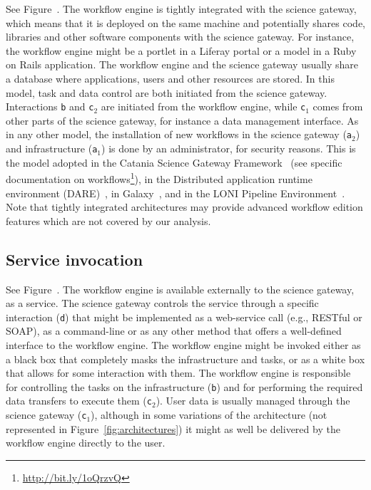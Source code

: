 \documentclass[preprint,3p,twocolumn]{elsarticle}
\begin{document}
See Figure~. The workflow engine is tightly
integrated with the science gateway, which means that it is deployed
on the same machine and potentially shares code, libraries and other
software components with the science gateway. For instance, the
workflow engine might be a portlet in a Liferay portal or a model
in a Ruby on Rails application. The workflow engine and the science
gateway usually share a database where applications, users and other
resources are stored.  In this model, task and
data control are both initiated from the science gateway. Interactions
\texttt{b} and \texttt{c$_2$} are initiated from the workflow engine,
while \texttt{c$_1$} comes from other parts of the science gateway,
for instance a data management interface. As in any other model, the
installation of new workflows in the science gateway (\texttt{a$_2$})
and infrastructure (\texttt{a$_1$}) is done by an administrator, for
security reasons. This is the model adopted in the Catania Science
Gateway Framework~\cite{ardizzone2012decide} (see specific documentation on
workflows\footnote{\url{http://bit.ly/1oQrzvQ}}), in the Distributed
application runtime environment
(DARE)~\cite{maddineni2012distributed}, in
Galaxy~\cite{goecks2010galaxy}, and in the LONI Pipeline
Environment~\cite{dinov2009efficient}. Note that tightly integrated
architectures may provide advanced workflow edition features which are
not covered by our analysis.

\subsection{Service invocation}

See Figure~. The workflow engine is available
externally to the science gateway, as a service. The science gateway
controls the service through a specific interaction (\texttt{d}) that
might be implemented as a web-service call (e.g., RESTful or SOAP), as
a command-line or as any other method that offers a well-defined
interface to the workflow engine. The workflow engine might be invoked
either as a black box that completely masks the infrastructure and
tasks, or as a white box that allows for some interaction with
them. The workflow engine is responsible for controlling the tasks on
the infrastructure (\texttt{b}) and for performing the required data
transfers to execute them (\texttt{c$_2$}). User data is usually
managed through the science gateway (\texttt{c$_1$}), although in some
variations of the architecture (not represented in
Figure~\ref{fig:architectures}) it might as well be delivered by the
workflow engine directly to the user. 
\end{document}
